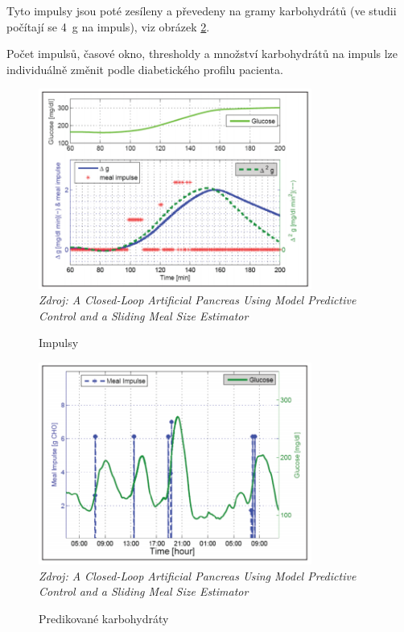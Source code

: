 Tyto impulsy jsou poté zesíleny a převedeny na gramy karbohydrátů (ve studii počítají se 4~g na impuls), viz obrázek \ref{fig:threshold2}.

Počet impulsů, časové okno, thresholdy a množství karbohydrátů na impuls lze individuálně změnit podle diabetického profilu pacienta.

\begin{figure}[H]
\caption{Impulsy}
\label{fig:threshold1}
\centering
\includegraphics[width=0.8\textwidth]{img/analyza/threshold1.png}\\
\textit{Zdroj: A Closed-Loop Artificial Pancreas Using Model Predictive Control and a Sliding Meal Size Estimator \citep{Analyza.Thresholds}}
\end{figure}
\begin{figure}[H]
\caption{Predikované karbohydráty}
\label{fig:threshold2}
\centering
\includegraphics[width=0.8\textwidth]{img/analyza/threshold2.png}\\
\textit{Zdroj: A Closed-Loop Artificial Pancreas Using Model Predictive Control and a Sliding Meal Size Estimator \citep{Analyza.Thresholds}}
\end{figure}

